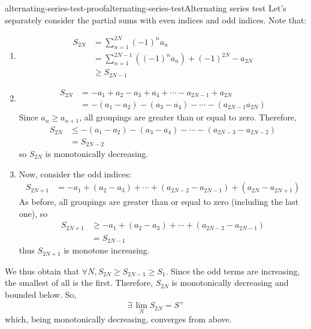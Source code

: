 \documentclass[preview]{standalone}
\begin{document}
\begin{snippetproof}{alternating-series-test-proof}{alternating-series-test}{Alternating series test}
    Let's separately consider the partial sums with even indices and odd indices.
    Note that:
    \begin{enumerate}
        \item \begin{align*}
            S_{2N} &= \sum_{n=1}^{2N} {(-1)}^n a_n \\
            &= \sum_{n=1}^{2N-1} \left({(-1)}^n a_n \right) + {(-1)}^{2N} - a_{2N} \\
            &\geq S_{2N-1}
        \end{align*}
        \item \begin{align*}
            S_{2N} &= -a_1 + a_2 -a_3 + a_4 + \cdots - a_{2N-1} + a_{2N} \\
            &= -(a_1 - a_2) -(a_3 - a_4) - \cdots - (a_{2N-1} a_{2N})
        \end{align*}
        Since \(a_n \geq a_{n+1}\), all groupings are greater than or equal to zero.
        Therefore,
        \begin{align*}
            S_{2N} &\leq -(a_1 - a_2) - (a_3 - a_4) - \cdots - (a_{2N-3} - a_{2N-2}) \\
            &= S_{2N - 2}
        \end{align*}
        so \(S_{2N}\) is monotonically decreasing.
        \item Now, consider the odd indices:
        \begin{align*}
            S_{2N + 1} &= -a_1 + (a_2 - a_3) + \cdots + (a_{2N-2} - a_{2N-1})
            + (a_{2N} - a_{2N+1})
        \end{align*}
        As before, all groupings are greater than or equal to zero (including the last one),
        so
        \begin{align*}
            S_{2N + 1} &\geq -a_1 + (a_2 - a_3) + \cdots + (a_{2N-2} - a_{2N-1}) \\
            &= S_{2N-1}
        \end{align*}
        thus \(S_{2N+1}\) is monotone increasing.
    \end{enumerate}
    We thus obtain that \(\forall N, S_{2N} \geq S_{2N-1} \geq S_1\). Since the odd terms are increasing, the smallest of all is the first.
    Therefore, \(S_{2N}\) is monotonically decreasing and bounded below.
    So,
    \[
        \exists\, \lim_N S_{2N} = S^+
    \]
    which, being monotonically decreasing, converges from above.

\end{snippetproof}
\end{document}
